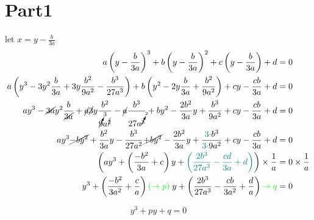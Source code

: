 \documentclass[A4]{ctexart}
\begin{document}
	\section*{Part1}
	let $x=y-\frac b{3a}$
	\begin{align*}
		a\left(y-\frac b{3a}\right)^3+b\left(y-\frac b{3a}\right)^2+c\left(y-\frac b{3a}\right)+d&=0\\
		a\left(y^3-3y^2\frac b{3a}+3y\frac{b^2}{9a^2}-\frac{b^3}{27a^3}\right)+b\left(y^2-2y\frac b{3a}+\frac{b^2}{9a^2}\right)+cy-\frac{cb}{3a}+d&=0\\
		ay^3-\cancel{3a}y^2\frac b{\cancel{3a}}+\cancel{a}\cancel{3}y\frac{b^2}{\cancelto{3}{9}a^{\cancel{2}}}-\cancel{a}\frac{b^3}{27a^{\cancelto{2}{3}}}+by^2-\frac{2b^2}{3a}y+\frac{b^3}{9a^2}+cy-\frac{cb}{3a}+d&=0\\
		ay^3\cancel{-by^2}+\frac{b^2}{3a}y-\frac{b^3}{27a^2}\cancel{+by^2}-\frac{2b^2}{3a}y+\frac{{\color{teal}3\cdot}b^3}{{\color{teal}3\cdot}9a^2}+cy-\frac{cb}{3a}+d&=0\\
		\left(ay^3+\left(\frac{-b^2}{3a}+c\right)y+{\color{teal}\left(\frac{2b^3}{27a^3}-\frac{cd}{3a}+d\right)}\right)\times\frac 1a&=0\times \frac 1a\\
		y^3+\left(\frac{-b^2}{3a^2}+\frac ca\right){\color{green}(\to p)\;}y+\left(\frac{2b^3}{27a^3}-\frac{cb}{3a^2}+\frac da\right){\color{green}\to q}&=0
	\end{align*}
	\begin{tcolorbox}[colback=white,colframe=yellow]
			\[y^3+py+q=0\]
	\end{tcolorbox}
	\newpage
\end{document}
